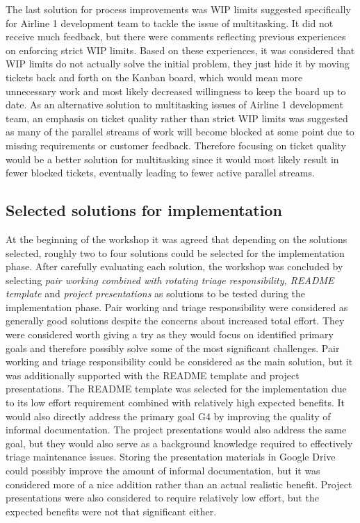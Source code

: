 The last solution for process improvements was WIP limits suggested specifically for Airline 1 development team to tackle the issue of multitasking. It did not receive much
feedback, but there were comments reflecting previous experiences on enforcing strict WIP limits. Based on these experiences, it was considered that WIP limits do not
actually solve the initial problem, they just hide it by moving tickets back and forth on the Kanban board, which would mean more unnecessary work and most likely decreased
willingness to keep the board up to date. As an alternative solution to multitasking issues of Airline 1 development team, an emphasis on ticket quality rather than strict
WIP limits was suggested as many of the parallel streams of work will become blocked at some point due to missing requirements or customer feedback. Therefore focusing
on ticket quality would be a better solution for multitasking since it would most likely result in fewer blocked tickets, eventually leading to fewer active parallel
streams.

\subsection{Selected solutions for implementation}

At the beginning of the workshop it was agreed that depending on the solutions selected, roughly two to four solutions could be selected for the implementation phase.
After carefully evaluating each solution, the workshop was concluded by selecting
\emph{pair working combined with rotating triage responsibility, README template} and \emph{project presentations} as solutions to be tested during the implementation phase.
Pair working and triage responsibility were considered as generally
good solutions despite the concerns about increased total effort. They were considered worth giving a try as they would focus on identified primary goals and therefore
possibly solve some of the most significant challenges. Pair working and triage responsibility could be considered as the main solution, but it was additionally supported
with the README template and project presentations. The README template was selected for the implementation due to its low effort requirement combined with relatively high expected benefits.
It would also directly address the primary goal G4 by improving the quality of informal documentation. The project presentations would also address the same goal, but they would
also serve as a background knowledge required to effectively triage maintenance issues. Storing the presentation materials in Google Drive could possibly improve
the amount of informal documentation, but it was considered more of a nice addition rather than an actual realistic benefit. Project presentations were also considered to require
relatively low effort, but the expected benefits were not that significant either.

